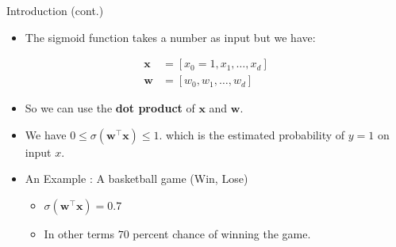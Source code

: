 \documentclass[serif, aspectratio=169]{beamer}
\begin{document}
    
\begin{frame}{Introduction (cont.)}
    \begin{itemize}
      \item The sigmoid function takes a number as input but we have:
    \end{itemize}
        \begin{align*}
            \mathbf{x} &= [x_0=1,x_1, \dots, x_d] \\
            \mathbf{w} &= [w_0, w_1, \dots, w_d]
        \end{align*}
    \begin{itemize} 
      \item So we can use the \textbf{dot product} of $\mathbf{x}$ and $\mathbf{w}$.
      
      \item We have $0\leq \sigma (\mathbf{w}^\top \mathbf{x}) \leq 1$. which is the estimated probability of $y=1$ on input $x$.

      \item An Example : A basketball game (Win, Lose)
        \begin{itemize}
            \item $\sigma (\mathbf{w}^\top  \mathbf{x}) = 0.7$
            \item In other terms $70$ percent chance of winning the game.
        \end{itemize}
        
    \end{itemize}
\end{frame}
\end{document}
